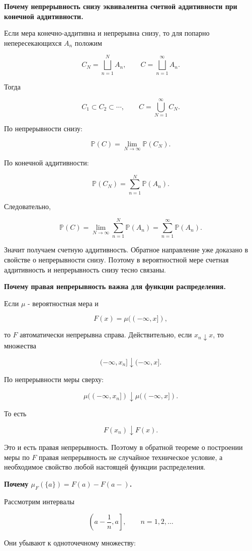 \documentclass[
  11pt,
  a4paper,
]{article}
\begin{document}
\textbf{Почему непрерывность снизу эквивалентна счетной аддитивности при
конечной аддитивности.}

Если мера конечно-аддитивна и непрерывна снизу, то для попарно
непересекающихся \(A_n\) положим

\[
C_N=\bigsqcup_{n=1}^{N}A_n,
\qquad
C=\bigsqcup_{n=1}^{\infty}A_n.
\]

Тогда

\[
C_1\subset C_2\subset\cdots,
\qquad
C=\bigcup_{N=1}^{\infty}C_N.
\]

По непрерывности снизу:

\[
\mathbb P(C)=\lim_{N\to\infty}\mathbb P(C_N).
\]

По конечной аддитивности:

\[
\mathbb P(C_N)=\sum_{n=1}^{N}\mathbb P(A_n).
\]

Следовательно,

\[
\mathbb P(C)
=
\lim_{N\to\infty}\sum_{n=1}^{N}\mathbb P(A_n)
=
\sum_{n=1}^{\infty}\mathbb P(A_n).
\]

Значит получаем счетную аддитивность. Обратное направление уже доказано
в свойстве о непрерывности снизу. Поэтому в вероятностной мере счетная
аддитивность и непрерывность снизу тесно связаны.

\textbf{Почему правая непрерывность важна для функции распределения.}

Если \(\mu\) - вероятностная мера и

\[
F(x)=\mu((-\infty,x]),
\]

то \(F\) автоматически непрерывна справа. Действительно, если
\(x_n\downarrow x\), то множества

\[
(-\infty,x_n]\downarrow(-\infty,x].
\]

По непрерывности меры сверху:

\[
\mu((-\infty,x_n])\downarrow\mu((-\infty,x]).
\]

То есть

\[
F(x_n)\downarrow F(x).
\]

Это и есть правая непрерывность. Поэтому в обратной теореме о построении
меры по \(F\) правая непрерывность не случайное техническое условие, а
необходимое свойство любой настоящей функции распределения.

\textbf{Почему \(\mu_F(\{a\})=F(a)-F(a-)\).}

Рассмотрим интервалы

\[
\left(a-\frac1n,a\right],\qquad n=1,2,\ldots
\]

Они убывают к одноточечному множеству:
\end{document}
